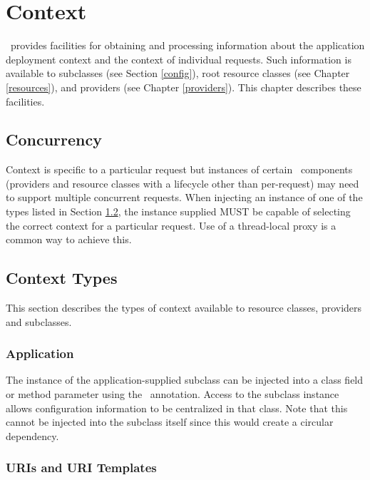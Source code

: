 \chapter{Context}
\label{context}

\jaxrs\ provides facilities for obtaining and processing information about the application deployment context and the context of individual requests. Such information is available to  subclasses (see Section \ref{config}), root resource classes (see Chapter \ref{resources}), and providers (see Chapter \ref{providers}). This chapter describes these facilities.

\section{Concurrency}

Context is specific to a particular request but instances of certain \jaxrs\ components (providers and resource classes with a lifecycle other than per-request) may need to support multiple concurrent requests. When injecting an instance of one of the types listed in Section \ref{contexttypes}, the instance supplied MUST be capable of selecting the correct context for a particular request. Use of a thread-local proxy is a common way to achieve this.

\section{Context Types}
\label{contexttypes}

This section describes the types of context available to resource classes, providers and  subclasses.

\subsection{Application}

The instance of the application-supplied  subclass can be injected into a class field or method parameter using the \Context\ annotation. Access to the  subclass instance allows configuration information to be centralized in that class. Note that this cannot be injected into the  subclass itself since this would create a circular dependency.

\subsection{URIs and URI Templates}

